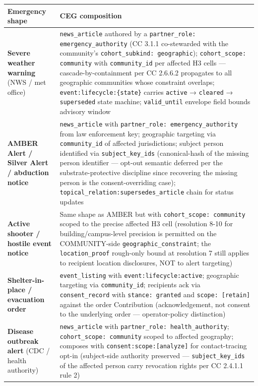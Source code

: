 \documentclass[11pt]{article}
\begin{document}
{\footnotesize
\begin{longtable}{|p{8.0cm}|p{8.0cm}|}\hline
\textbf{Emergency shape} & \textbf{CEG composition} \\ \hline\endhead
\textbf{Severe weather warning} (NWS / met office) & \texttt{news\_article} authored by a \texttt{partner\_role: emergency\_authority} (CC 3.1.1 co-stewarded with the community's \texttt{cohort\_subkind: geographic}); \texttt{cohort\_scope: community} with \texttt{community\_id} per affected H3 cells — cascade-by-containment per CC 2.6.6.2 propagates to all geographic communities whose constraint overlaps; \texttt{event:lifecycle:\{state\}} carries \texttt{active} → \texttt{cleared} → \texttt{superseded} state machine; \texttt{valid\_until} envelope field bounds advisory window \\ \hline
\textbf{AMBER Alert / Silver Alert / abduction notice} & \texttt{news\_article} with \texttt{partner\_role: emergency\_authority} from law enforcement key; geographic targeting via \texttt{community\_id} of affected jurisdictions; subject person identified via \texttt{subject\_key\_ids} (canonical-hash of the missing person identifier — opt-out semantic deferred per the substrate-protective discipline since recovering the missing person is the consent-overriding case); \texttt{topical\_relation:supersedes\_article} chain for status updates \\ \hline
\textbf{Active shooter / hostile event notice} & Same shape as AMBER but with \texttt{cohort\_scope: community} scoped to the precise affected H3 cell (resolution 8-10 for building/campus-level precision is permitted on the COMMUNITY-side \texttt{geographic\_constraint}; the \texttt{location\_proof} rough-only bound at resolution 7 still applies to recipient location disclosures, NOT to alert targeting) \\ \hline
\textbf{Shelter-in-place / evacuation order} & \texttt{event\_listing} with \texttt{event:lifecycle:active}; geographic targeting via \texttt{community\_id}; recipients ack via \texttt{consent\_record} with \texttt{stance: granted} and \texttt{scope: [retain]} against the order Contribution (acknowledgement, not consent to the underlying order — operator-policy distinction) \\ \hline
\textbf{Disease outbreak alert} (CDC / health authority) & \texttt{news\_article} with \texttt{partner\_role: health\_authority}; \texttt{cohort\_scope: community} scoped to affected geography; composes with \texttt{consent:scope:[analyze]} for contact-tracing opt-in (subject-side authority preserved — \texttt{subject\_key\_ids} of the affected person carry revocation rights per CC 2.4.1.1 rule 2) \\ \hline

\end{longtable}}
\end{document}

